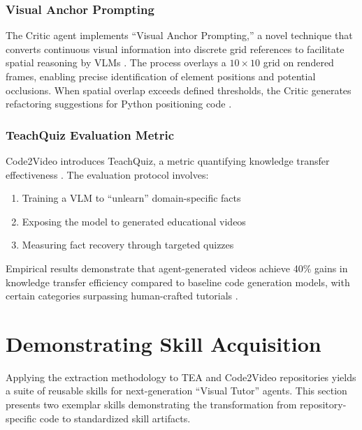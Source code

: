 \documentclass[11pt,a4paper]{article}
\begin{document}
\subsubsection{Visual Anchor Prompting}

The Critic agent implements ``Visual Anchor Prompting,'' a novel technique that converts continuous visual information into discrete grid references to facilitate spatial reasoning by VLMs \cite{github2024code2video, openreview2024code2video}. The process overlays a $10 \times 10$ grid on rendered frames, enabling precise identification of element positions and potential occlusions. When spatial overlap exceeds defined thresholds, the Critic generates refactoring suggestions for Python positioning code \cite{github2024code2video, openreview2024code2video}.

\subsubsection{TeachQuiz Evaluation Metric}

Code2Video introduces TeachQuiz, a metric quantifying knowledge transfer effectiveness \cite{arxiv2024code2video, github2024code2video, arxivpdf2024code2video}. The evaluation protocol involves:

\begin{enumerate}
\item Training a VLM to ``unlearn'' domain-specific facts
\item Exposing the model to generated educational videos
\item Measuring fact recovery through targeted quizzes
\end{enumerate}

Empirical results demonstrate that agent-generated videos achieve 40\% gains in knowledge transfer efficiency compared to baseline code generation models, with certain categories surpassing human-crafted tutorials \cite{arxivpdf2024code2video}.

\section{Demonstrating Skill Acquisition}

Applying the extraction methodology to TEA and Code2Video repositories yields a suite of reusable skills for next-generation ``Visual Tutor'' agents. This section presents two exemplar skills demonstrating the transformation from repository-specific code to standardized skill artifacts.
\end{document}
